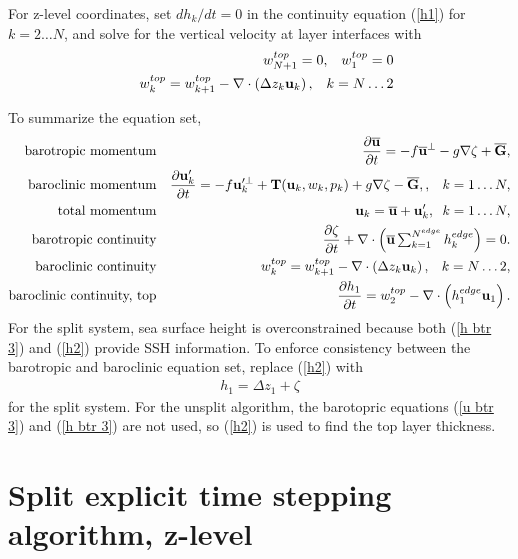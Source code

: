 \documentclass[11pt]{report}
\newcommand{\ds}{\displaystyle}
\begin{document}
For  z-level coordinates, set $dh_k/dt=0$ in the continuity equation (\ref{h1}) for $k=2\ldots N$, and solve for the vertical velocity at layer interfaces with
\begin{eqnarray}   
\label{w 1} &&
w^{top}_{N+1} = 0,\;\;\; w^{top}_{1} = 0 
\\&&
w^{top}_k = w^{top}_{k+1} - \nabla \cdot \left( \Delta z_k {\bf u}_k \right), \;\;\; k=N\ldots 2
\end{eqnarray}

To summarize the equation set,
\begin{eqnarray}   
\mbox{barotropic momentum} && \ds
\label{u btr 3}
 \frac{\partial \ubtr}{\partial t} 
  = - f\ubtr^{\perp}
- g\nabla \zeta  
+ {\overline {\bf G}}, \\
\mbox{baroclinic momentum} && \ds
\label{u bcl 3}
\frac{\partial \ubcl}{\partial t} 
= -f{\bf u}'^{\perp}_k + {\bf T}({\bf u}_{k},w_{k},p_{k}) +g\nabla \zeta  
-{\overline {\bf G}},
, \;\;\; k=1\ldots N,\\
\mbox{total momentum} && \ds
\label{u tot 3}
{\bf u}_{k} =\ubtr + {\bf u}'_{k}, 
\;\; k=1\ldots N,
\\
\label{h btr 3}
\mbox{barotropic continuity} &&
 \displaystyle
 \frac{\partial \zeta}{\partial t} 
 + \nabla \cdot \left( \ubtr \textstyle\sum_{k=1}^{N^{edge}} h_k^{edge} \right) 
= 0.\\
\label{w bcl 3}
\mbox{baroclinic continuity} &&
 \displaystyle
w^{top}_k = w^{top}_{k+1} - \nabla \cdot \left( \Delta z_k {\bf u}_k \right), \;\;\; k=N\ldots 2,
\\
\label{h2}
\mbox{baroclinic continuity, top} &&
 \displaystyle
 \frac{\partial h_1}{\partial t} 
= w^{top}_{2} - \nabla \cdot \left( h_1^{edge} {\bf u}_1 \right).
\end{eqnarray}
For the split system, sea surface height is overconstrained because both (\ref{h btr 3}) and (\ref{h2}) provide SSH information.  To enforce consistency between the barotropic and baroclinic equation set, replace (\ref{h2}) with
\begin{eqnarray}   
h_1 = \Delta z_1 + \zeta
\end{eqnarray}
for the split system.  For the unsplit algorithm, the barotopric equations (\ref{u btr 3}) and (\ref{h btr 3}) are not used, so (\ref{h2}) is used to find the top layer thickness.

\newpage
\section{Split explicit time stepping algorithm, z-level}
\end{document}
